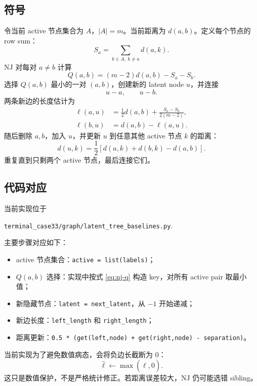 \documentclass[UTF8,11pt]{ctexart}
\begin{document}
\subsection{符号}

令当前 active 节点集合为 $A$，$|A|=m$。当前距离为 $d(a,b)$。定义每个节点的 row sum：
\begin{equation}
  S_a=\sum_{k\in A,\ k\neq a} d(a,k).
\end{equation}
NJ 对每对 $a\neq b$ 计算
\begin{equation}
  Q(a,b)=(m-2)d(a,b)-S_a-S_b.
  \label{eq:nj-q}
\end{equation}
选择 $Q(a,b)$ 最小的一对 $(a,b)$，创建新的 latent node $u$，并连接
\[
  u-a,\qquad u-b.
\]
两条新边的长度估计为
\begin{align}
  \ell(a,u)
  &=\frac{1}{2}d(a,b)+\frac{S_a-S_b}{2(m-2)},\\
  \ell(b,u)
  &=d(a,b)-\ell(a,u).
\end{align}
随后删除 $a,b$，加入 $u$，并更新 $u$ 到任意其他 active 节点 $k$ 的距离：
\begin{equation}
  d(u,k)=\frac{1}{2}\left[d(a,k)+d(b,k)-d(a,b)\right].
  \label{eq:nj-update}
\end{equation}
重复直到只剩两个 active 节点，最后连接它们。

\subsection{代码对应}

当前实现位于
\begin{center}
\texttt{terminal\_case33/graph/latent\_tree\_baselines.py}.
\end{center}
主要步骤对应如下：
\begin{itemize}[leftmargin=2em]
  \item active 节点集合：\texttt{active = list(labels)}；
  \item $Q(a,b)$ 选择：实现中按式 \eqref{eq:nj-q} 构造 key，对所有 active pair 取最小值；
  \item 新隐藏节点：\texttt{latent = next\_latent}，从 $-1$ 开始递减；
  \item 新边长度：\texttt{left\_length} 和 \texttt{right\_length}；
  \item 距离更新：\texttt{0.5 * (get(left,node) + get(right,node) - separation)}。
\end{itemize}

当前实现为了避免数值病态，会将负边长截断为 $0$：
\begin{equation}
  \hat{\ell}\leftarrow \max(\hat{\ell},0).
\end{equation}
这只是数值保护，不是严格统计修正。若距离误差较大，NJ 仍可能选错 sibling。
\end{document}
